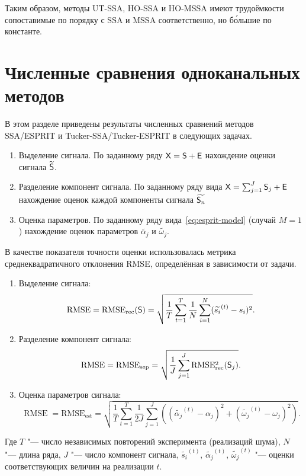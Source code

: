 \documentclass[specialist,
  substylefile = spbu.rtx,
subf,href,colorlinks=true, 12pt]{disser}
\theoremstyle{plain}
\theoremstyle{definition}
\theoremstyle{remark}
\def\tssa/{Tucker-SSA}
\def\newtssa/{UT-SSA}
\def\tesprit/{Tucker-ESPRIT}
\begin{document}
Таким образом, методы \newtssa/, HO-SSA и HO-MSSA имеют трудоёмкости
сопоставимые по порядку с SSA и MSSA соответственно, но б\'{о}льшие
по константе.

\section{Численные сравнения одноканальных методов}\label{sec:1d-comparison}
В этом разделе приведены результаты численных сравнений методов
SSA/ESPRIT и \tssa//\tesprit/ в следующих задачах.
\begin{enumerate}
  \item Выделение сигнала. По заданному ряду $\mathsf{X} = \mathsf{S} + \mathsf{E}$
    нахождение оценки сигнала $\widetilde{\mathsf{S}}$.
  \item Разделение компонент сигнала. По заданному ряду вида $\mathsf{X} =
    \sum_{j=1}^J\mathsf{S}_j + \mathsf{E}$ нахождение оценок каждой компоненты
    сигнала $\widetilde{\mathsf{S}_n}$
  \item Оценка параметров. По заданному ряду
    вида~\eqref{eq:esprit-model} (случай $M = 1$) нахождение оценок
    параметров $\widetilde{\alpha_j}$ и $\widetilde{\omega_j}$.
\end{enumerate}

В качестве показателя точности оценки использовалась метрика
среднеквадратичного отклонения RMSE, определённая в зависимости от задачи.
\begin{enumerate}
  \item Выделение сигнала:
    \begin{equation*}
      \operatorname{RMSE} = \operatorname{RMSE_{rec}}(\mathsf{S}) =
      \sqrt{\frac{1}{T} \sum_{t=1}^{T} \frac{1}{N}\sum_{i=1}^N
      (\widetilde{s_i}^{(t)} - s_i)^2}.
    \end{equation*}
  \item Разделение компонент сигнала:
    \begin{equation*}
      \operatorname{RMSE} = \operatorname{RMSE_{sep}} =
      \sqrt{\frac{1}{J} \sum_{j=1}^J\operatorname{RMSE_{rec}^2}(\mathsf{S}_j)}.
    \end{equation*}
  \item Оценка параметров сигнала:
    \begin{equation*}
      \operatorname{RMSE} = \operatorname{RMSE_{est}} =
      \sqrt{\frac{1}{T}\sum_{t=1}^T \frac{1}{2J}
        \sum_{j=1}^J\left((\widetilde{\alpha_j}^{(t)} - \alpha_j)^2 +
      (\widetilde{\omega_j}^{(t)} - \omega_j)^2\right)}.
    \end{equation*}
\end{enumerate}
Где $T$ "--- число независимых повторений эксперимента (реализаций
шума), $N$ "--- длина ряда, $J$ "--- число компонент сигнала,
$\widetilde{s_i}^{(t)},\, \widetilde{\alpha_j}^{(t)},\,
\widetilde{\omega_j}^{(t)}$ "--- оценки соответствующих величин на
реализации $t$.
\end{document}
